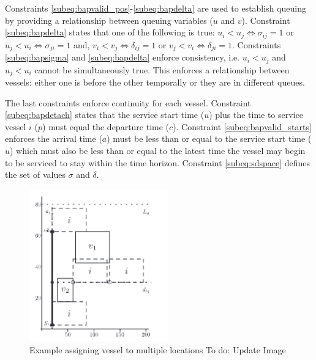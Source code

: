 \documentclass[letterpaper, 10pt, conference]{IEEEtran}
\newcommand{\TODO}[1]{{\color{green} To do: #1}} %
\begin{document}
Constraints \ref{subeq:bapvalid_pos}-\ref{subeq:bapdelta} are used to establish queuing by providing a relationship between queuing variables (\(u\) and \(v\)). Constraint \eqref{subeq:bapdelta} states that one of the following is true: \(u_i < u_j \iff \sigma_{ij} = 1\) or \(u_j < u_i \iff \sigma_{ji} = 1\) and, \(v_i < v_j \iff \delta_{ij} = 1\) or \(v_j < v_i \iff \delta_{ji} = 1\). Constraints \eqref{subeq:bapsigma} and \eqref{subeq:bapdelta} enforce consistency, i.e. \(u_i < u_j\) and \(u_j < u_i\) cannot be simultaneously true. This enforces a relationship between vessels: either one is before the other temporally or they are in different queues. 


The last constraints enforce continuity for each vessel. Constraint \eqref{subeq:bapdetach} states that the service start time (\(u\)) plus the time to service vessel \(i\) (\(p\)) must equal the departure time (\(c\)). Constraint \eqref{subeq:bapvalid_starts} enforces the arrival time (\(a\)) must be less than or equal to the service start time (\(u\)) which must also be less than or equal to the latest time the vessel may begin to be serviced to stay within the time horizon. Constraint \eqref{subeq:sdspace} defines the set of values \(\sigma\) and \(\delta\).

\begin{figure}
	\centerline{\includegraphics[width=6cm]{multipleassign.png}}
	\caption{Example assigning vessel to multiple locations\TODO{Update Image}}
	\label{fig:multipleassign}
\end{figure}
\end{document}

